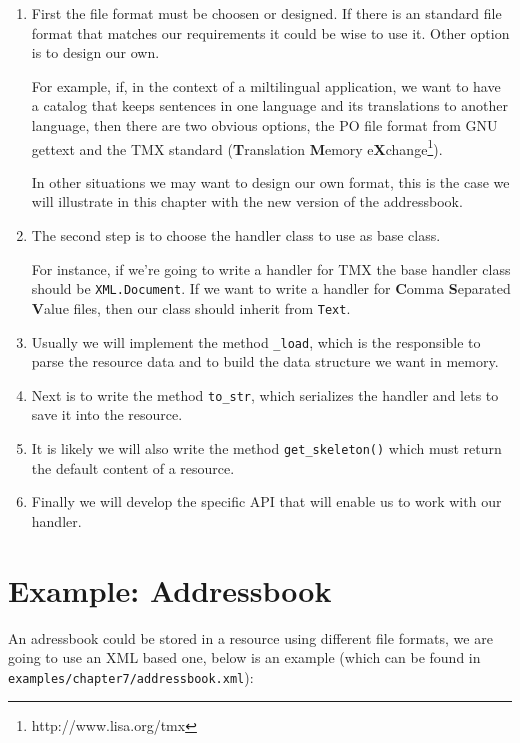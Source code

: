 \begin{enumerate}
  \item First the file format must be choosen or designed. If there is an
    standard file format that matches our requirements it could be wise to
    use it. Other option is to design our own.

    For example, if, in the context of a miltilingual application, we want
    to have a catalog that keeps sentences in one language and its
    translations to another language, then there are two obvious options,
    the PO file format from GNU gettext and the TMX standard ({\bf T}ranslation
    {\bf M}emory e{\bf X}change\footnote{http://www.lisa.org/tmx}).

    In other situations we may want to design our own format, this is the
    case we will illustrate in this chapter with the new version of
    the addressbook.

  \item The second step is to choose the handler class to use as base class.

    For instance, if we're going to write a handler for TMX the base handler
    class should be {\tt XML.Document}. If we want to write a handler for
    {\bf C}omma {\bf S}eparated {\bf V}alue files, then our class should
    inherit from {\tt Text}.

  \item Usually we will implement the method {\tt \_load}, which is the
    responsible to parse the resource data and to build the data structure
    we want in memory.

  \item Next is to write the method {\tt to\_str}, which serializes the
    handler and lets to save it into the resource.

  \item It is likely we will also write the method {\tt get\_skeleton()}
    which must return the default content of a resource.

  \item Finally we will develop the specific API that will enable us to
    work with our handler.
\end{enumerate}

\section{Example: Addressbook}

An adressbook could be stored in a resource using different file formats,
we are going to use an XML based one, below is an example (which can be
found in {\tt examples/chapter7/addressbook.xml}):

